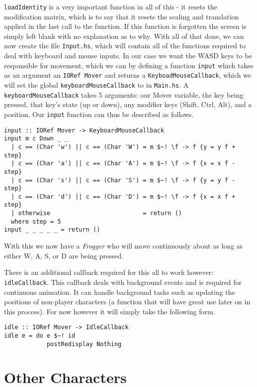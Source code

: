 \documentclass[12pt, a4paper]{report}
\begin{document}
\verb|loadIdentity| is a very important function in all of this - it resets the modification matrix, which is to say that it resets the scaling and translation applied in the last call to the function.
If this function is forgotten the screen is simply left blank with no explanation as to why.
With all of that done, we can now create the file \verb|Input.hs|, which will contain all of the functions required to deal with keyboard and mouse inputs.
In our case we want the WASD keys to be responsible for movement, which we can by defining a function \verb|input| which takes as an argument an \verb|IORef Mover| and returns a \verb|KeyboadMouseCallback|, which we will set the global \verb|keyboardMouseCallback| to in \verb|Main.hs|.
A \verb|keyboardMouseCallback| takes 5 arguments: our Mover variable, the key being pressed, that key's state (up or down), any modifier keys (Shift, Ctrl, Alt), and a position.
Our \verb|input| function can thus be described as follows.

\begin{lstlisting}[xleftmargin=-0.1\textwidth, xrightmargin=-0.1\textwidth]
input :: IORef Mover -> KeyboardMouseCallback
input m c Down _ _
  | c == (Char 'w') || c == (Char 'W') = m $~! \f -> f {y = y f + step}
  | c == (Char 'a') || c == (Char 'A') = m $~! \f -> f {x = x f - step}
  | c == (Char 's') || c == (Char 'S') = m $~! \f -> f {y = y f - step}
  | c == (Char 'd') || c == (Char 'D') = m $~! \f -> f {x = x f + step}
  | otherwise                          = return ()
  where step = 5
input _ _ _ _ _ = return ()
\end{lstlisting}

With this we now have a \textit{Frogger} who will move continuously about as long as either W, A, S, or D are being pressed.

There is an additional callback required for this all to work however: \verb|idleCallback|.
This callback deals with background events and is required for continuous animation.
It can handle background tasks such as updating the positions of non-player characters (a function that will have great use later on in this process).
For now however it will simply take the following form.

\begin{lstlisting}
idle :: IORef Mover -> IdleCallback
idle e = do e $~! id
            postRedisplay Nothing
\end{lstlisting}
\section{Other Characters}
\end{document}

